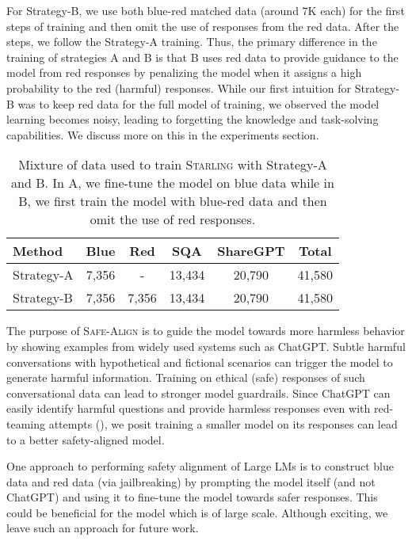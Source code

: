 \documentclass{article}
\newcommand{\starlingemoji}{\textsc{Starling}}
\newcommand{\alignment}{\textsc{Safe-Align}}
\begin{document}
{For Strategy-B, we use both blue-red matched data (around 7K each) for the first  steps of training and then omit the use of responses from the red data. After the  steps, we follow the Strategy-A training. Thus, the primary difference in the training of strategies A and B is that B uses red data to provide guidance to the model from red responses by penalizing the model when it assigns a high probability to the red (harmful) responses. While our first intuition for Strategy-B was to keep red data for the full model of training, we observed the model learning becomes noisy, leading to forgetting the knowledge and task-solving capabilities. We discuss more on this in the experiments section.

\begin{table}[t]
\centering
\caption{ Mixture of data used to train \starlingemoji{} with Strategy-A and B. In A, we fine-tune the model on blue data while in B, we first train the model with blue-red data and then omit the use of red responses.}
\begin{tabular}{@{}lccccc@{}}
\toprule
Method & Blue  & Red   & SQA    & ShareGPT & Total  \\ \midrule
Strategy-A      & 7,356 & -     & 13,434 & 20,790   & 41,580 \\
Strategy-B      & 7,356 & 7,356 & 13,434 & 20,790   & 41,580 \\ \bottomrule
\end{tabular}
\label{tab:train-data-stats}
\end{table}

The purpose of \alignment{} is to guide the model towards more harmless behavior by showing examples from widely used systems such as ChatGPT. Subtle harmful conversations with hypothetical and fictional scenarios can trigger the model to generate harmful information. Training on ethical (safe) responses of such conversational data can lead to stronger model guardrails. Since ChatGPT can easily identify harmful questions and provide harmless responses even with red-teaming attempts (), we posit training a smaller model on its responses can lead to a better safety-aligned model.

One approach to performing safety alignment of Large LMs is to construct blue data and red data (via jailbreaking) by prompting the model itself (and not ChatGPT) and using it to fine-tune the model towards safer responses. This could be beneficial for the model which is of large scale. Although exciting, we leave such an approach for future work.

}
\end{document}
